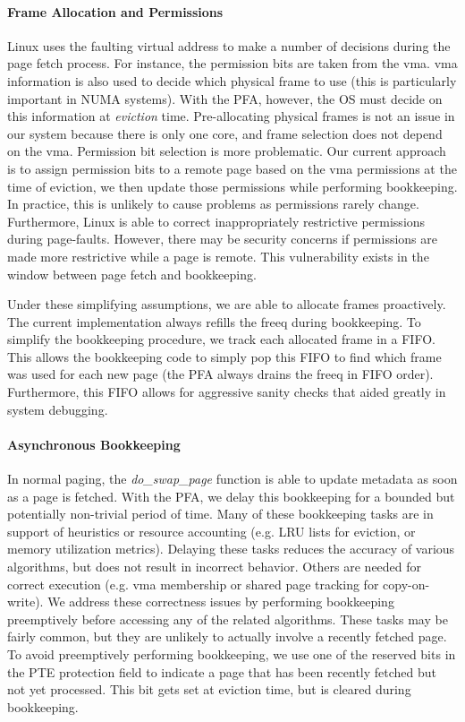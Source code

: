 \paragraph{Frame Allocation and Permissions}
Linux uses the faulting virtual address to make a number of decisions during
the page fetch process. For instance, the permission bits are taken from the
\gls{vma}. \gls{vma} information is also used to decide which physical frame to
use (this is particularly important in NUMA systems). With the PFA, however,
the OS must decide on this information at \emph{eviction} time. Pre-allocating
physical frames is not an issue in our system because there is only one core,
and frame selection does not depend on the \gls{vma}. Permission bit selection
is more problematic. Our current approach is to assign permission bits to a
remote page based on the \gls{vma} permissions at the time of eviction, we then
update those permissions while performing bookkeeping. In practice, this is
unlikely to cause problems as permissions rarely change. Furthermore, Linux is
able to correct inappropriately restrictive permissions during page-faults.
However, there may be security concerns if permissions are made more
restrictive while a page is remote. This vulnerability exists in the window
between page fetch and bookkeeping.

Under these simplifying assumptions, we are able to allocate frames
proactively. The current implementation always refills the \gls{freeq} during
bookkeeping. To simplify the bookkeeping procedure, we track
each allocated frame in a FIFO. This allows the bookkeeping code to simply pop
this FIFO to find which frame was used for each new page (the PFA always drains
the \gls{freeq} in FIFO order). Furthermore, this FIFO allows for aggressive
sanity checks that aided greatly in system debugging.

\paragraph{Asynchronous Bookkeeping}
In normal paging, the \emph{do\_swap\_page} function is able to update metadata as
soon as a page is fetched. With the PFA, we delay this bookkeeping for a
bounded but potentially non-trivial period of time. Many of these bookkeeping
tasks are in support of heuristics or resource accounting (e.g. LRU lists for
eviction, or memory utilization metrics). Delaying these tasks reduces the
accuracy of various algorithms, but does not result in incorrect behavior.
Others are needed for correct execution (e.g. \gls{vma} membership or shared
page tracking for copy-on-write). We address these correctness issues by
performing bookkeeping preemptively before accessing any of the related
algorithms. These tasks may be fairly common, but they are unlikely to actually
involve a recently fetched page. To avoid preemptively performing bookkeeping,
we use one of the reserved bits in the PTE protection field to indicate a page
that has been recently fetched but not yet processed. This bit gets set at
eviction time, but is cleared during bookkeeping.


